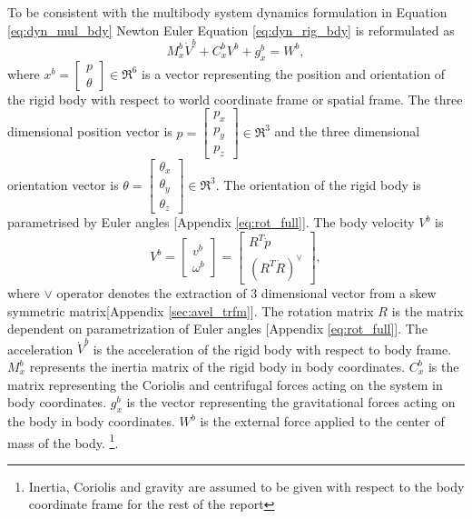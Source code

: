 To be consistent with the multibody system dynamics formulation in Equation \ref{eq:dyn_mul_bdy} Newton Euler Equation \ref{eq:dyn_rig_bdy} is reformulated as
\begin{equation}
\label{eq:dyn_rig_bdy_sh}
M_x^b \dot V^b + C_x^b V^b+g_x^b = W^b,
\end{equation}
 where $x^b=\begin{bmatrix}p \\ \theta\end{bmatrix} \in \Re^6$ is a vector representing the position and orientation of the rigid body with respect to world coordinate frame or spatial frame. The three dimensional position vector is $p=\begin{bmatrix}p_x \\ p_y \\ p_z \end{bmatrix} \in \Re^3$ and the three dimensional orientation vector is $ \theta= \begin{bmatrix} \theta_{x} \\ \theta_{y} \\ \theta_{z} \end{bmatrix} \in \Re^3$. The orientation of the rigid body is parametrised by Euler angles [Appendix \ref{eq:rot_full}]. 
 The body velocity $V^b$ is 
 \begin{equation}
\label{eq:body_vel}
V^b =
\begin{bmatrix}
v^b \\ \omega^b
\end{bmatrix}
= \begin{bmatrix}
R^T \dot{p} \\ (R^T \dot{R})^\vee
\end{bmatrix},
\end{equation}
where $\vee$ operator denotes the extraction of 3 dimensional vector from a skew symmetric matrix[Appendix \ref{sec:avel_trfm}]. The rotation matrix $R$ is the matrix dependent on parametrization of Euler angles [Appendix \ref{eq:rot_full}]. The acceleration $\dot{V}^b$ is the acceleration of the rigid body with respect to body frame. $M_x^b$ represents the inertia matrix of the rigid body in body coordinates. $C_x^b$ is the matrix representing the Coriolis and centrifugal forces acting on the system in body coordinates. $g_x^b$ is the vector representing the gravitational forces acting on the body in body coordinates. $W^b$ is the external force applied to the center of mass of the body. \footnote[2]{Inertia, Coriolis and gravity are assumed to be given with respect to the body coordinate frame for the rest of the report}.

